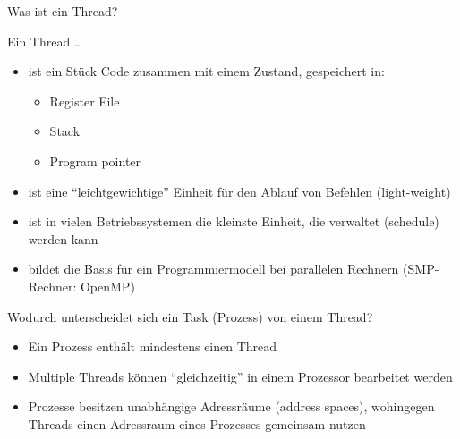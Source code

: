 {
    Was ist ein Thread?
}
{
    Ein Thread \ldots
    \begin{itemize}[$\ldots$]
        \item ist ein Stück Code zusammen mit einem Zustand, gespeichert in:
              \begin{itemize}
                  \item Register File
                  \item Stack
                  \item Program pointer
              \end{itemize}
        \item ist eine \enquote{leichtgewichtige} Einheit für den Ablauf von Befehlen (light-weight)
        \item ist in vielen Betriebssystemen die kleinste Einheit, die verwaltet (schedule) werden kann
        \item bildet die Basis für ein Programmiermodell bei parallelen Rechnern (SMP-Rechner: OpenMP)
    \end{itemize}
}

{
    Wodurch unterscheidet sich ein Task (Prozess) von einem Thread?
}
{
    \begin{itemize}
        \item Ein Prozess enthält mindestens einen Thread
        \item Multiple Threads können \enquote{gleichzeitig} in einem Prozessor bearbeitet werden
        \item Prozesse besitzen unabhängige Adressräume (address spaces), wohingegen Threads einen Adressraum eines Prozesses gemeinsam nutzen
    \end{itemize}
}